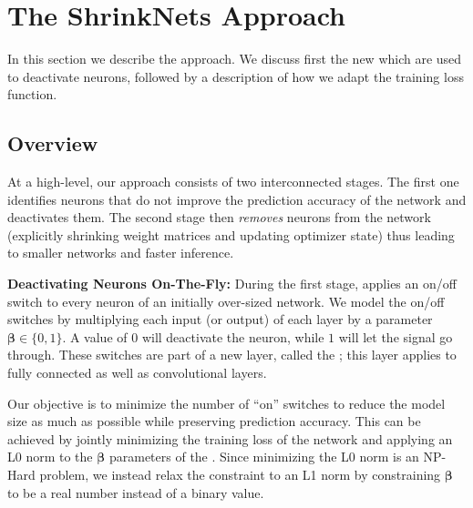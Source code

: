
\section{The ShrinkNets Approach}
\label{sec:approach}

In this section we describe the \shrink approach. We discuss first the new \swls
which are used to deactivate neurons, followed by a description of how we adapt
the training loss function.


\subsection{Overview}

At a high-level, our approach consists of two interconnected stages.
The first one identifies neurons that do not improve the
prediction accuracy of the network and deactivates them. 
The second stage then {\it removes} neurons from the network (explicitly
shrinking weight matrices and updating optimizer state) thus leading to 
smaller networks and faster inference. 

\noindent\textbf{Deactivating Neurons On-The-Fly: }During the first stage,
\shrink applies an on/off switch to every neuron of an initially over-sized
network. We model the on/off switches by multiplying each input (or output) of
each layer by a parameter $\bm{\beta}\in\{0,1\}$. A value of $0$
will deactivate the neuron, while $1$ will let the signal go through. These
switches are part of a new layer, called the \swl; this layer applies 
to fully connected as well as convolutional layers.

Our objective is to minimize the number of ``on'' switches to reduce the model size as much
as possible while preserving prediction accuracy. This can be achieved by jointly
minimizing the training loss of the network and applying an L0 norm to the 
$\bm{\beta}$ parameters of the \swl. 
Since minimizing the L0 norm is an NP-Hard problem, we instead relax the constraint
to an L1 norm by constraining $\bm{\beta}$ to be a real number
instead of a binary value.

